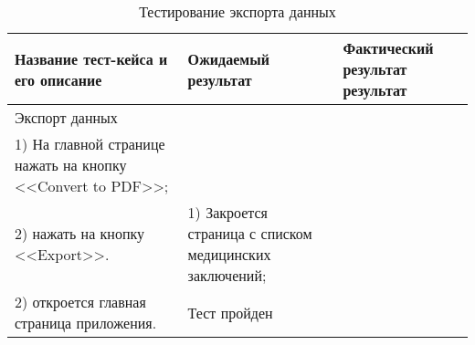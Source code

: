 \begin{longtable}[p]{| >{\raggedright}p{}                     
                     | >{\raggedright}p{}
                     | >{\raggedright\arraybackslash}p{}|}
  \caption{Тестирование экспорта данных}
  \label{sec:testing:march_testing} \tabularnewline

  \hline
      Название тест-кейса и его описание & Ожидаемый результат & Фактический результат результат \\
   \hline
   Экспорт данных\\ 
   1) На главной странице нажать на кнопку <<Convert to PDF>>; \\
   2) нажать на кнопку <<Export>>.

   &
   1) Закроется страница с списком медицинских заключений;\\
   2) откроется главная страница приложения.

   &
   Тест пройден \\
   \hline
\end{longtable}